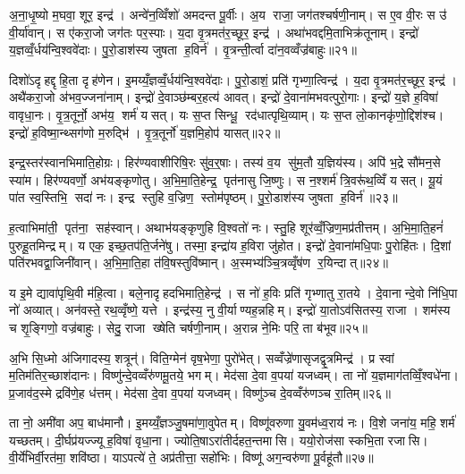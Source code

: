अ॒ना॒धृ॒ष्यो म॒घवा॒ शूर॒ इन्द्र॑। अन्वे॑न॒व्विँशो॑ अमदन्त पू॒र्वीः। अ॒य राजा॒ जग॑तश्चर्\mbox{}षणी॒नाम्। स ए॒व वी॒रः स उ॑ वी॒र्या॑वान्। स ए॑करा॒जो जग॑तः पर॒स्पाः। य॒दा वृ॒त्रमत॑र॒च्छूर॒ इन्द्र॑। अथा॑भवद्दमि॒ताभिक्र॑तूनाम्। इन्द्रो॑ य॒ज्ञव्वँ॒र्धय॑न्वि॒श्ववे॑दाः। पु॒रो॒डाश॑स्य जुषता ह॒विर्न॑। वृ॒त्रन्ती॒र्त्वा दा॑न॒वव्वँज्र॑बाहुः॥२१॥

दिशो॑ऽदृहद्दृहि॒ता दृह॑णेन। इ॒मय्यँ॒ज्ञव्वँ॒र्धय॑न्वि॒श्ववे॑दाः। पु॒रो॒डाशं॒ प्रति॑ गृभ्णा॒त्विन्द्र॑। य॒दा वृ॒त्रमत॑र॒च्छूर॒ इन्द्र॑। अथै॑करा॒जो अ॑भव॒ज्जना॑नाम्। इन्द्रो॑ दे॒वाञ्छ॑म्बर॒हत्य॑ आवत्। इन्द्रो॑ दे॒वाना॑मभवत्पुरो॒गाः। इन्द्रो॑ य॒ज्ञे ह॒विषा॑ वावृधा॒नः। वृ॒त्र॒तूर्नो॒ अभ॑य॒ शर्म॑ यसत्। यः स॒प्त सिन्धू॒ रद॑धात्पृथि॒व्याम्। यः स॒प्त लो॒कानकृ॑णो॒द्दिश॑श्च। इन्द्रो॑ ह॒विष्मा॒न्थ्सग॑णो म॒रुद्भि॑। वृ॒त्र॒तूर्नो॑ य॒ज्ञमि॒होप॑ यासत्॥२२॥\anuvakamend[व॒व॒र्थ॒ वि॒थ्स॒ इन्द्र॑स्तु॒रायास्तु वृत्र॒तूर्ये॒ वज्र॑बाहुः पृथि॒व्यान्त्रीणि॑ च]

इन्द्र॒स्तर॑स्वानभिमाति॒होग्रः। हिर॑ण्यवाशीरिषि॒रः सु॑व॒र्॒षाः। तस्य॑ व॒य सु॑म॒तौ य॒ज्ञिय॑स्य। अपि॑ भ॒द्रे सौ॑मन॒से स्या॑म। हिर॑ण्यवर्णो॒ अभ॑यङ्कृणोतु। अ॒भि॒मा॒ति॒हेन्द्र॒ पृत॑नासु जि॒ष्णुः। स न॒श्शर्म॑ त्रि॒वरू॑थ॒व्विँ यसत्। यू॒यं पा॑त स्व॒स्तिभि॒ सदा॑ नः। इन्द्र स्तुहि व॒ज्रिण॒ स्तोम॑पृष्ठम्। पु॒रो॒डाश॑स्य जुषता ह॒विर्न॑॥२३॥

ह॒त्वाभिमा॑ती॒ पृत॑ना॒ सह॑स्वान्। अथाभ॑यङ्कृणुहि वि॒श्वतो॑ नः। स्तु॒हि शूर॑व्वँ॒ज्रिण॒मप्र॑तीत्तम्। अ॒भि॒मा॒ति॒हनं॑ पुरुहू॒तमिन्द्रम्। य एक॒ इच्छ॒तप॑ति॒र्जने॑षु। तस्मा॒ इन्द्रा॑य ह॒विरा जु॑होत। इन्द्रो॑ दे॒वाना॑मधि॒पाः पु॒रोहि॑तः। दि॒शां पति॑रभवद्वा॒जिनी॑वान्। अ॒भि॒मा॒ति॒हा त॑वि॒षस्तुवि॑ष्मान्। अ॒स्मभ्य॑ञ्चि॒त्रव्वृँष॑ण र॒यिन्दात्॥२४॥

य इ॒मे द्यावा॑पृथि॒वी म॑हि॒त्वा। बले॒नादृहदभिमाति॒हेन्द्र॑। स नो॑ ह॒विः प्रति॑ गृभ्णातु रा॒तये। दे॒वानान्दे॒वो नि॑धि॒पा नो॑ अव्यात्। अन॑वस्ते॒ रथ॒व्वृँष्णे॒ यत्ते। इन्द्र॑स्य॒ नु वी॒र्याण्यह॒न्नहिम्। इन्द्रो॑ या॒तोऽव॑सितस्य॒ राजा। शम॑स्य च शृ॒ङ्गिणो॒ वज्र॑बाहुः। सेदु॒ राजा ख्षेति चर्\mbox{}षणी॒नाम्। अ॒रान्न ने॒मिः परि॒ ता ब॑भूव॥२५॥

अ॒भि सि॒ध्मो अ॑जिगादस्य॒ शत्रून्॑। विति॒ग्मेन॑ वृष॒भेणा॒ पुरो॑भेत्। सव्वँज्रे॑णासृजद्वृ॒त्रमिन्द्र॑। प्र स्वां म॒तिम॑तिर॒च्छाश॑दानः। विष्णु॑न्दे॒वव्वँरु॑णमू॒तये॒ भगम्। मेद॑सा दे॒वा व॒पया॑ यजध्वम्। ता नो॑ य॒ज्ञमाग॑तव्विँ॒श्वधे॑ना। प्र॒जाव॑द॒स्मे द्रवि॑णे॒ह ध॑त्तम्। मेद॑सा दे॒वा व॒पया॑ यजध्वम्। विष्णु॑ञ्च दे॒वव्वँरु॑णञ्च रा॒तिम्॥२६॥

ता नो॒ अमी॑वा अप॒ बाध॑मानौ। इ॒मय्यँ॒ज्ञञ्जु॒षमा॑णा॒वुपेतम्। विष्णू॑वरुणा यु॒वम॑ध्व॒राय॑ नः। वि॒शे जना॑य॒ महि॒ शर्म॑ यच्छतम्। दी॒र्घप्र॑यज्ज्यू ह॒विषा॑ वृधा॒ना। ज्योति॒षाऽरा॑तीर्दहत॒न्तमासि। ययो॒रोज॑सा स्कभि॒ता रजासि। वी॒र्ये॑भिर्वी॒रत॑मा॒ शवि॑ष्ठा। याऽपत्ये॑ ते॒ अप्र॑तीत्ता॒ सहो॑भिः। विष्णू॑ अग॒न्वरु॑णा पू॒र्वहू॑तौ॥२७॥

